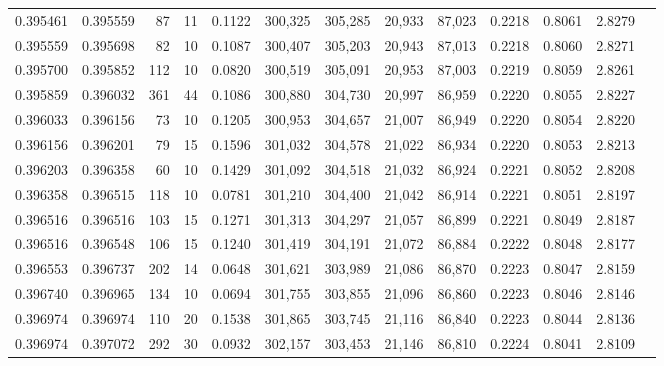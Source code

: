 \begin{tabular}{rrrrrrrrrrrrr}
0.395461 & 0.395559 &    87 &  11 &                                     0.1122 & 300,325 & 305,285 &  20,933 &  87,023 & 0.2218 & 0.8061 & 2.8279 \\
0.395559 & 0.395698 &    82 &  10 &                                     0.1087 & 300,407 & 305,203 &  20,943 &  87,013 & 0.2218 & 0.8060 & 2.8271 \\
0.395700 & 0.395852 &   112 &  10 &                                     0.0820 & 300,519 & 305,091 &  20,953 &  87,003 & 0.2219 & 0.8059 & 2.8261 \\
0.395859 & 0.396032 &   361 &  44 &                                     0.1086 & 300,880 & 304,730 &  20,997 &  86,959 & 0.2220 & 0.8055 & 2.8227 \\
0.396033 & 0.396156 &    73 &  10 &                                     0.1205 & 300,953 & 304,657 &  21,007 &  86,949 & 0.2220 & 0.8054 & 2.8220 \\
0.396156 & 0.396201 &    79 &  15 &                                     0.1596 & 301,032 & 304,578 &  21,022 &  86,934 & 0.2220 & 0.8053 & 2.8213 \\
0.396203 & 0.396358 &    60 &  10 &                                     0.1429 & 301,092 & 304,518 &  21,032 &  86,924 & 0.2221 & 0.8052 & 2.8208 \\
0.396358 & 0.396515 &   118 &  10 &                                     0.0781 & 301,210 & 304,400 &  21,042 &  86,914 & 0.2221 & 0.8051 & 2.8197 \\
0.396516 & 0.396516 &   103 &  15 &                                     0.1271 & 301,313 & 304,297 &  21,057 &  86,899 & 0.2221 & 0.8049 & 2.8187 \\
0.396516 & 0.396548 &   106 &  15 &                                     0.1240 & 301,419 & 304,191 &  21,072 &  86,884 & 0.2222 & 0.8048 & 2.8177 \\
0.396553 & 0.396737 &   202 &  14 &                                     0.0648 & 301,621 & 303,989 &  21,086 &  86,870 & 0.2223 & 0.8047 & 2.8159 \\
0.396740 & 0.396965 &   134 &  10 &                                     0.0694 & 301,755 & 303,855 &  21,096 &  86,860 & 0.2223 & 0.8046 & 2.8146 \\
0.396974 & 0.396974 &   110 &  20 &                                     0.1538 & 301,865 & 303,745 &  21,116 &  86,840 & 0.2223 & 0.8044 & 2.8136 \\
0.396974 & 0.397072 &   292 &  30 &                                     0.0932 & 302,157 & 303,453 &  21,146 &  86,810 & 0.2224 & 0.8041 & 2.8109 \\

\end{tabular}
